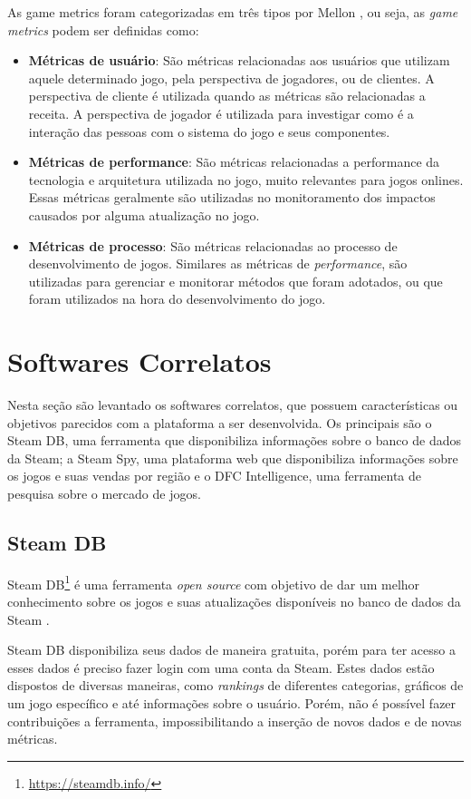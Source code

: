 As game metrics foram categorizadas em três tipos por Mellon \cite{game_metrics}, ou seja, as \textit{game metrics} podem ser definidas como:
\begin{itemize}
	\item \textbf{Métricas de usuário}: São métricas relacionadas aos usuários que utilizam aquele determinado jogo, pela perspectiva de jogadores, ou de clientes. A perspectiva de cliente é utilizada quando as métricas são relacionadas a receita. A perspectiva de jogador é utilizada para investigar como é a interação das pessoas com o sistema do jogo e seus componentes.
	\item \textbf{Métricas de performance}: São métricas relacionadas a performance da tecnologia e arquitetura utilizada no jogo, muito relevantes para jogos onlines. Essas métricas geralmente são utilizadas no monitoramento dos impactos causados por alguma atualização no jogo.
	\item \textbf{Métricas de processo}: São métricas relacionadas ao processo de desenvolvimento de jogos. Similares as métricas de \textit{performance}, são utilizadas para gerenciar e monitorar métodos que foram adotados, ou que foram utilizados na hora do desenvolvimento do jogo. 
\end{itemize}
\section{Softwares Correlatos}
Nesta seção são levantado os softwares correlatos, que possuem características ou objetivos parecidos com a plataforma a ser desenvolvida. Os principais são o Steam DB, uma ferramenta que disponibiliza informações sobre o banco de dados da Steam; a Steam Spy, uma plataforma web que disponibiliza informações sobre os jogos e suas vendas por região e o DFC Intelligence, uma ferramenta de pesquisa sobre o mercado de jogos.
\subsection{Steam DB}
Steam DB\footnote[1]{\url{https://steamdb.info/}} é uma ferramenta \textit{open source} com objetivo de dar um melhor conhecimento sobre os jogos e suas atualizações disponíveis no banco de dados da Steam \cite{steam_db}.

Steam DB disponibiliza seus dados de maneira gratuita, porém para ter acesso a esses dados é preciso fazer login com uma conta da Steam. Estes dados estão dispostos de diversas maneiras, como \textit{rankings} de diferentes categorias, gráficos de um jogo específico e até informações sobre o usuário. Porém, não é possível fazer contribuições a ferramenta, impossibilitando a inserção de novos dados e de novas métricas.

